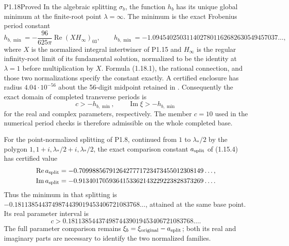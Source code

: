 \begin{statement}{P1.18}{Proved}
In the algebraic splitting $\sigma_b$, the function $h_b$ has its
unique global minimum at the finite-root point $\lambda=\infty$.
The minimum is the exact Frobenius period constant
\[
 h_{b,\min}=-\frac{96}{625\pi}\operatorname{Re}(XH_\infty)_{03},
 \qquad
 h_{b,\min}=-1.0945402503114027801162682630549457037\ldots,
\tag{1.18.1}
\]
where $X$ is the normalized integral intertwiner of P1.15 and
$H_\infty$ is the regular infinity-root limit of its fundamental
solution, normalized to be the identity at $\lambda=1$ before
multiplication by $X$.  Formula (1.18.1), the rational connection,
and those two normalizations specify the constant exactly.
A certified enclosure has radius $4.04\cdot10^{-56}$ about the
56-digit midpoint retained in
.
Consequently the exact domain of completed transverse periods is
\[
 c>-h_{b,\min},\qquad
 \operatorname{Im}\xi>-h_{b,\min}
\]
for the real and complex parameters, respectively.
The member $c=10$ used in the numerical period checks is therefore
admissible on the whole completed base.

For the point-normalized splitting of P1.8, continued from
$1$ to $\lambda_*/2$ by the polygon
$1,1+i,\lambda_*/2+i,\lambda_*/2$, the exact comparison constant
$a_{\rm split}$ of (1.15.4) has certified value
\[
\begin{split}
 \operatorname{Re}a_{\rm split}
   &=-0.7099885679126427771723473455012308149\ldots,\\
 \operatorname{Im}a_{\rm split}
   &=-0.9134017059364153362143229223828373269\ldots.
\end{split}
\]
Thus the minimum in that splitting is
$-0.1811385443749874439019453406721083768\ldots$,
attained at the same base point.  Its real parameter interval is
\[
 c>0.1811385443749874439019453406721083768\ldots.
\]
The full parameter comparison remains
$\xi_b=\xi_{\rm original}-a_{\rm split}$; both its real and imaginary
parts are necessary to identify the two normalized families.
\end{statement}
